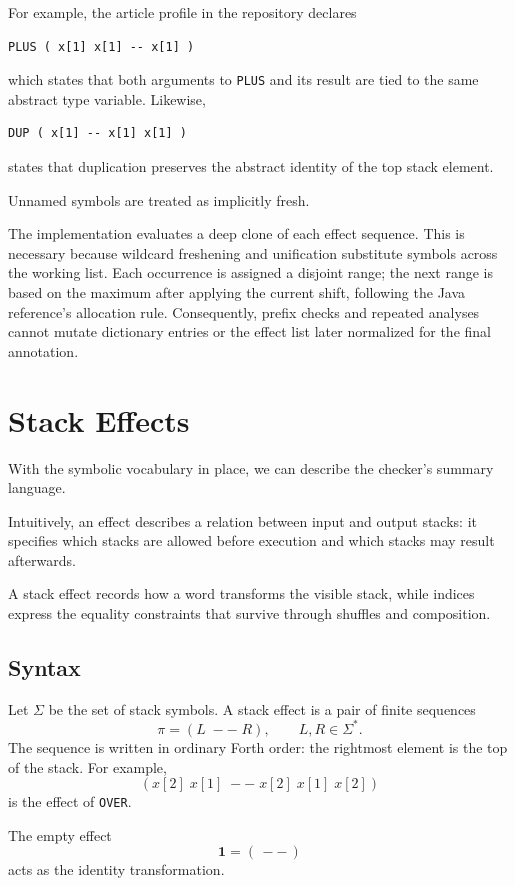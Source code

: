 \documentclass[acmsmall,screen,review,anonymous,nonacm]{acmart}
\newcommand{\id}{\mathbf{1}}
\begin{document}
For example, the article profile in the repository declares
\begin{lstlisting}
PLUS ( x[1] x[1] -- x[1] )
\end{lstlisting}
which states that both arguments to \texttt{PLUS} and its result are tied to the same abstract type variable. Likewise,
\begin{lstlisting}
DUP ( x[1] -- x[1] x[1] )
\end{lstlisting}
states that duplication preserves the abstract identity of the top stack element.

Unnamed symbols are treated as implicitly fresh.

The implementation evaluates a deep clone of each effect sequence. This is
necessary because wildcard freshening and unification substitute symbols across
the working list. Each occurrence is assigned a disjoint range; the next range
is based on the maximum after applying the current shift, following the Java
reference's allocation rule. Consequently, prefix checks and repeated analyses
cannot mutate dictionary entries or the effect list later normalized for the
final annotation.

\section{Stack Effects}
\label{sec:stack-effects}
With the symbolic vocabulary in place, we can describe the checker's summary language.

Intuitively, an effect describes a relation between input and output stacks: it specifies
which stacks are allowed before execution and which stacks may result afterwards.

A stack effect records how a word transforms the visible stack, while indices express the
equality constraints that survive through shuffles and composition.

\subsection{Syntax}
Let $\Sigma$ be the set of stack symbols. A stack effect is a pair of finite sequences
\[
\pi = (L \; -- \; R), \qquad L,R \in \Sigma^\ast.
\]
The sequence is written in ordinary Forth order: the rightmost element is the top of the stack. For example,
\[
(x[2]\;x[1]\; -- \; x[2]\;x[1]\;x[2])
\]
is the effect of \texttt{OVER}.

The empty effect
\[
\id = (\, -- \,)
\]
acts as the identity transformation.
\end{document}
